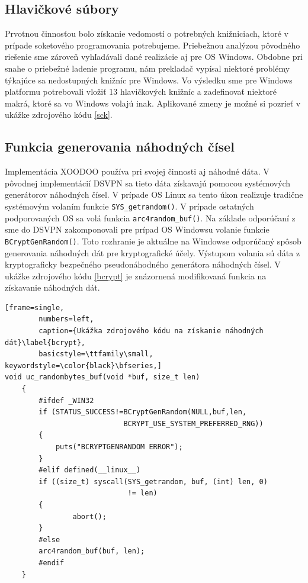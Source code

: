 \subsection{Hlavičkové súbory}
Prvotnou činnosťou bolo získanie vedomostí o potrebných knižniciach, ktoré v prípade soketového programovania potrebujeme. Priebežnou analýzou pôvodného riešenie sme zároveň vyhľadávali dané realizácie aj pre OS Windows. Obdobne pri snahe o priebežné ladenie programu, nám prekladač vypísal niektoré problémy týkajúce sa nedostupných knižníc pre Windows.  Vo výsledku sme pre Windows platformu potrebovali vložiť 13 hlavičkových knižníc a zadefinovať niektoré makrá, ktoré sa vo Windows volajú inak. Aplikované zmeny je možné si pozrieť v ukážke zdrojového kódu \ref{sck}. 
\subsection{Funkcia generovania náhodných čísel}
Implementácia XOODOO používa pri svojej činnosti aj náhodné dáta. V pôvodnej implementácií DSVPN sa tieto dáta získavajú pomocou systémových generátorov náhodných čísel. V prípade OS Linux sa tento úkon realizuje tradične systémovým volaním funkcie \lstinline|SYS_getrandom()|. V prípade ostatných podporovaných OS sa volá funkcia \lstinline|arc4random_buf()|. 
Na základe odporúčaní z \cite{bc} sme do DSVPN zakomponovali pre prípad OS Windowsu volanie funkcie \\\lstinline|BCryptGenRandom()|. Toto rozhranie je aktuálne na Windowse odporúčaný spôsob generovania náhodných dát pre kryptografické účely. Výstupom volania sú dáta z kryptograficky bezpečného pseudonáhodného generátora náhodných čísel. V ukážke zdrojového kódu \ref{bcrypt} je znázornená modifikovaná funkcia na získavanie náhodných dát. 

\begin{minipage}{\linewidth} 	
	\begin{lstlisting}[frame=single,
		numbers=left,
		caption={Ukážka zdrojového kódu na získanie náhodných dát}\label{bcrypt},
		basicstyle=\ttfamily\small, keywordstyle=\color{black}\bfseries,]
void uc_randombytes_buf(void *buf, size_t len)
	{
		#ifdef _WIN32
		if (STATUS_SUCCESS!=BCryptGenRandom(NULL,buf,len, 
		                    BCRYPT_USE_SYSTEM_PREFERRED_RNG))
		{
			puts("BCRYPTGENRANDOM ERROR");
		}
		#elif defined(__linux__)  
		if ((size_t) syscall(SYS_getrandom, buf, (int) len, 0)
		                     != len) 
		{
				abort();
		}
		#else
		arc4random_buf(buf, len);
		#endif
	}	
	\end{lstlisting}
\end{minipage}\\


